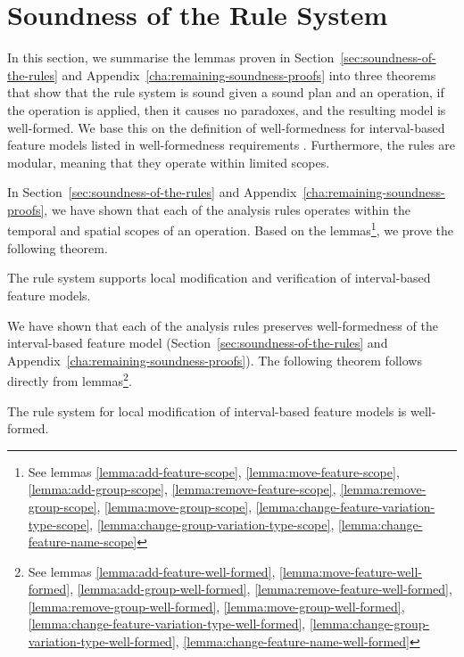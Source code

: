 \section{Soundness of the Rule System}
In this section, we summarise the lemmas proven in Section~\vref{sec:soundness-of-the-rules} and Appendix~\vref{cha:remaining-soundness-proofs} into three theorems that show that the rule system is sound \textemdash{} given a sound plan and an operation, if the operation is applied, then it causes no paradoxes, and the resulting model is well-formed. We base this on the definition of well-formedness for interval-based feature models listed in well-formedness requirements . Furthermore, the rules are modular, meaning that they operate within limited scopes.

In Section~\ref{sec:soundness-of-the-rules} and Appendix~\ref{cha:remaining-soundness-proofs}, we have shown that each of the analysis rules operates within the temporal and spatial scopes of an operation. Based on the lemmas\footnote{See lemmas \ref{lemma:add-feature-scope}, \ref{lemma:move-feature-scope}, \ref{lemma:add-group-scope}, \ref{lemma:remove-feature-scope}, \ref{lemma:remove-group-scope}, \ref{lemma:move-group-scope}, \ref{lemma:change-feature-variation-type-scope}, \ref{lemma:change-group-variation-type-scope}, \ref{lemma:change-feature-name-scope}}, we prove the following theorem.
\\
\begin{theorem}
  The rule system supports local modification and verification of interval-based feature models.
\end{theorem}

We have shown that each of the analysis rules preserves well-formedness of the interval-based feature model (Section~\ref{sec:soundness-of-the-rules} and Appendix~\ref{cha:remaining-soundness-proofs}). The following theorem follows directly from lemmas\footnote{See lemmas \ref{lemma:add-feature-well-formed}, \ref{lemma:move-feature-well-formed}, \ref{lemma:add-group-well-formed}, \ref{lemma:remove-feature-well-formed}, \ref{lemma:remove-group-well-formed}, \ref{lemma:move-group-well-formed}, \ref{lemma:change-feature-variation-type-well-formed}, \ref{lemma:change-group-variation-type-well-formed}, \ref{lemma:change-feature-name-well-formed}}.
\\
\begin{theorem}
  The rule system for local modification of interval-based feature models is well-formed.
\end{theorem}

